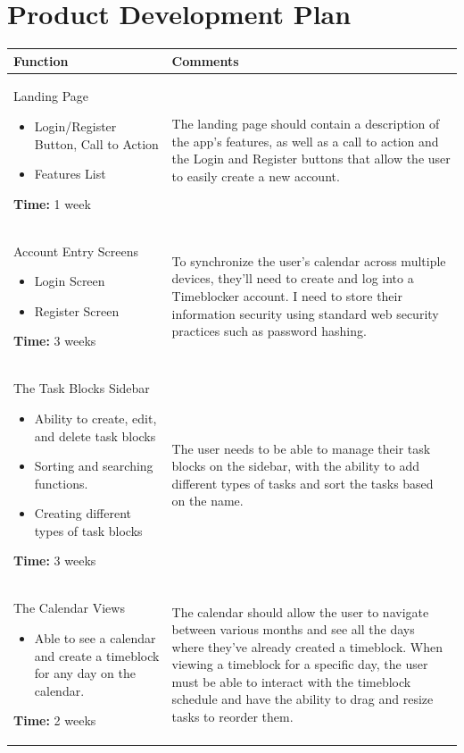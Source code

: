 \documentclass[12pt]{report}
\begin{document}
\section*{Product Development Plan}
\def\arraystretch{1.5}
\begin{xltabular}{\textwidth}{|X|X|}
	\hline
	Function
	& Comments
	\\\hline
	Landing Page
	\begin{itemize}
		\item Login/Register Button, Call to Action
		\item Features List
	\end{itemize}

	\medskip

	\textbf{Time:} 1 week
	&
	The landing page should contain a description of the app's features, as well as a call to action and the Login and Register buttons that allow the user to easily create a new account.
	\\\hline
	Account Entry Screens
	\begin{itemize}
		\item Login Screen
		\item Register Screen
	\end{itemize}
	\textbf{Time:} 3 weeks
	&
	To synchronize the user's calendar across multiple devices, they’ll need to create and log into a Timeblocker account. I need to store their information security using standard web security practices such as password hashing.
	\\\hline
	The Task Blocks Sidebar
	\begin{itemize}
		\item Ability to create, edit, and delete task blocks
		\item Sorting and searching functions.
		\item Creating different types of task blocks
	\end{itemize}
	\textbf{Time:} 3 weeks
	&
	The user needs to be able to manage their task blocks on the sidebar, with the ability to add different types of tasks and sort the tasks based on the name.
	\\\hline
	The Calendar Views
	\begin{itemize}
		\item Able to see a calendar and create a timeblock for any day on the calendar.
	\end{itemize}
	\textbf{Time:} 2 weeks
	&
	The calendar should allow the user to navigate between various months and see all the days where they've already created a timeblock. When viewing a timeblock for a specific day, the user must be able to interact with the timeblock schedule and have the ability to drag and resize tasks to reorder them.
	\\\hline
\end{xltabular}

\newpage
\end{document}
